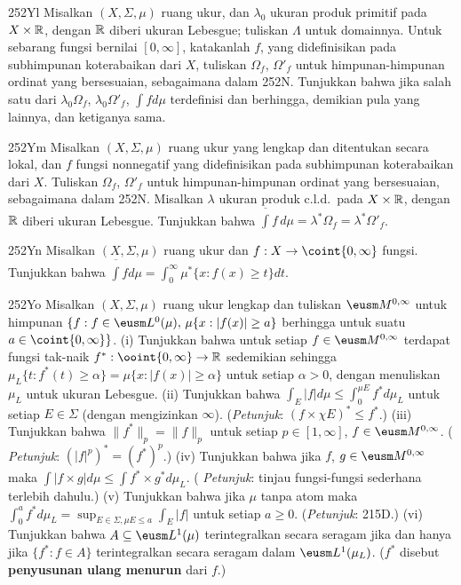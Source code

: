{\spheader 252Yl Misalkan $(X,\Sigma,\mu)$ ruang ukur, dan
$\lambda_0$ ukuran produk primitif pada
$X\times\Bbb R$, dengan $\Bbb R$ diberi ukuran Lebesgue; tuliskan
$\Lambda$ untuk domainnya. Untuk sebarang fungsi bernilai
$[0,\infty]$, katakanlah $f$, yang didefinisikan pada subhimpunan koterabaikan dari
$X$, tuliskan $\Omega_f$, $\Omega'_f$ untuk himpunan-himpunan ordinat yang
bersesuaian, sebagaimana dalam 252N. Tunjukkan bahwa jika salah satu dari
$\lambda_0\Omega_f$, $\lambda_0\Omega'_f$,
$\int fd\mu$ terdefinisi dan berhingga, demikian pula yang lainnya, dan
ketiganya sama.

\spheader 252Ym Misalkan $(X,\Sigma,\mu)$ ruang ukur yang lengkap dan
ditentukan secara lokal, dan $f$ fungsi nonnegatif yang didefinisikan pada
subhimpunan koterabaikan dari $X$. Tuliskan $\Omega_f$, $\Omega'_f$ untuk
himpunan-himpunan ordinat yang bersesuaian, sebagaimana dalam 252N. Misalkan
$\lambda$ ukuran produk c.l.d.\ pada $X\times\Bbb R$, dengan
$\Bbb R$ diberi ukuran Lebesgue. Tunjukkan bahwa
$\overline{\int}f\,d\mu=\lambda^*\Omega_f=\lambda^*\Omega'_f$.

\spheader 252Yn Misalkan $(X,\Sigma,\mu)$ ruang ukur dan
$f:X\to\coint{0,\infty}$ fungsi. Tunjukkan bahwa
$\overline{\int}fd\mu=\int_0^{\infty}\mu^*\{x:f(x)\ge t\}dt$.

\spheader 252Yo Misalkan $(X,\Sigma,\mu)$ ruang ukur lengkap dan
tuliskan $\eusm M^{0,\infty}$ untuk himpunan
$\{f:f\in\eusm L^0(\mu),\,\mu\{x:|f(x)|\ge a\}$ berhingga untuk suatu
$a\in\coint{0,\infty}\}$. (i) Tunjukkan bahwa untuk setiap
$f\in\eusm M^{0,\infty}$
terdapat fungsi tak-naik $f^*:\ooint{0,\infty}\to\Bbb R$ sedemikian sehingga
$\mu_L\{t:f^*(t)\ge\alpha\}=\mu\{x:|f(x)|\ge\alpha\}$ untuk
setiap $\alpha>0$, dengan menuliskan $\mu_L$ untuk ukuran Lebesgue. (ii) Tunjukkan
bahwa $\int_E|f|d\mu\le\int_0^{\mu E}f^*d\mu_L$ untuk setiap $E\in\Sigma$
(dengan mengizinkan $\infty$). ({\it Petunjuk\/}: $(f\times\chi E)^*\le f^*$.)
(iii) Tunjukkan bahwa $\|f^*\|_p=\|f\|_p$ untuk setiap $p\in[1,\infty]$,
$f\in\eusm M^{0,\infty}$. ({\it
Petunjuk\/}: $(|f|^p)^*=(f^*)^p$.) (iv) Tunjukkan bahwa jika $f$,
$g\in\eusm M^{0,\infty}$ maka
$\int|f\times g|d\mu\le\int f^*\times g^*d\mu_L$. ({\it
Petunjuk\/}: tinjau fungsi-fungsi sederhana terlebih dahulu.) (v) Tunjukkan bahwa
jika $\mu$ tanpa atom maka
$\int_0^af^*d\mu_L=\sup_{E\in\Sigma,\mu E\le a}\int_E|f|$
untuk setiap $a\ge 0$. ({\it Petunjuk\/}: 215D.) (vi) Tunjukkan bahwa
$A\subseteq\eusm L^1(\mu)$ terintegralkan secara seragam jika dan hanya jika
$\{f^*:f\in A\}$ terintegralkan secara seragam dalam $\eusm L^1(\mu_L)$.
($f^*$ disebut {\bf penyusunan ulang menurun} dari $f$.)

}

